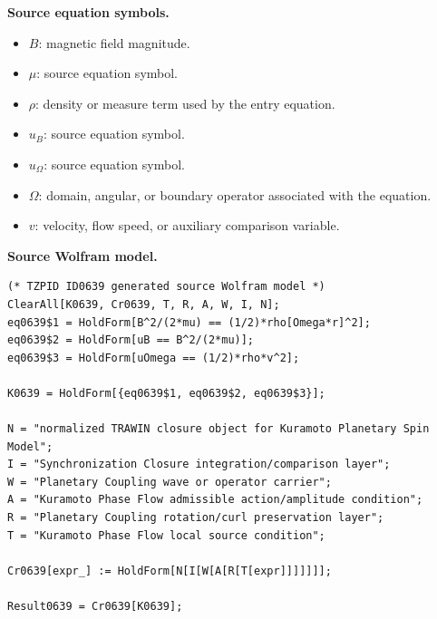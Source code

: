 \begin{minipage}[t]{0.49\linewidth}
\begingroup
\small
\raggedright
\textbf{Source equation symbols.}\par
\begin{itemize}[leftmargin=1.35em,itemsep=1pt,topsep=1pt,parsep=0pt]
    \item $B$: magnetic field magnitude.
    \item $\mu$: source equation symbol.
    \item $\rho$: density or measure term used by the entry equation.
    \item $u_B$: source equation symbol.
    \item $u_{\Omega}$: source equation symbol.
    \item $\Omega$: domain, angular, or boundary operator associated with the equation.
    \item $v$: velocity, flow speed, or auxiliary comparison variable.
\end{itemize}
\endgroup
\end{minipage}\hfill
\begin{minipage}[t]{0.47\linewidth}
\begingroup
\scriptsize
\raggedright
\textbf{Source Wolfram model.}\par
\begin{Verbatim}[fontsize=\tiny,breaklines=true,breakanywhere=true]
(* TZPID ID0639 generated source Wolfram model *)
ClearAll[K0639, Cr0639, T, R, A, W, I, N];
eq0639$1 = HoldForm[B^2/(2*mu) == (1/2)*rho[Omega*r]^2];
eq0639$2 = HoldForm[uB == B^2/(2*mu)];
eq0639$3 = HoldForm[uOmega == (1/2)*rho*v^2];

K0639 = HoldForm[{eq0639$1, eq0639$2, eq0639$3}];

N = "normalized TRAWIN closure object for Kuramoto Planetary Spin Model";
I = "Synchronization Closure integration/comparison layer";
W = "Planetary Coupling wave or operator carrier";
A = "Kuramoto Phase Flow admissible action/amplitude condition";
R = "Planetary Coupling rotation/curl preservation layer";
T = "Kuramoto Phase Flow local source condition";

Cr0639[expr_] := HoldForm[N[I[W[A[R[T[expr]]]]]]];

Result0639 = Cr0639[K0639];
\end{Verbatim}
\endgroup
\end{minipage}

